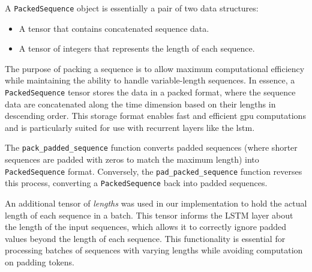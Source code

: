 A \texttt{PackedSequence} object is essentially a pair of two data structures:
\begin{itemize}
    \item A tensor that contains concatenated sequence data.
    \item A tensor of integers that represents the length of each sequence.
\end{itemize}

The purpose of packing a sequence is to allow maximum computational efficiency
while maintaining the ability to handle variable-length sequences. In essence,
a \texttt{PackedSequence} tensor stores the data in a packed format, where the
sequence data are concatenated along the time dimension based on their lengths
in descending order. This storage format enables fast and efficient \gls{gpu}
computations and is particularly suited for use with recurrent layers like the
\gls{lstm}.

The \texttt{pack\_padded\_sequence} function converts padded sequences (where
shorter sequences are padded with zeros to match the maximum length) into
\texttt{PackedSequence} format. Conversely, the \texttt{pad\_packed\_sequence}
function reverses this process, converting a \texttt{PackedSequence} back into
padded sequences.

An additional tensor of \textit{lengths} was used in our implementation to hold
the actual length of each sequence in a batch. This tensor informs the LSTM
layer about the length of the input sequences, which allows it to correctly
ignore padded values beyond the length of each sequence. This functionality is
essential for processing batches of sequences with varying lengths while
avoiding computation on padding tokens.

